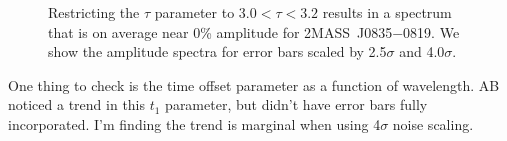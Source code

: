 \documentclass[manuscript]{aastex6}
\newcommand{\sha}{2MASS~J0835$-$0819}
\begin{document}
\begin{figure}[!t]
\centering
{}
	\caption{Restricting the $\tau$ parameter to $3.0 < \tau < 3.2$ results in a spectrum that is on average near 0\% amplitude for \sha. We show the amplitude spectra for error bars scaled by 2.5$\sigma$ and 4.0$\sigma$.}
	\label{fig:ampSpec0835TauRestrict}
	\vspace{0.1in}
\end{figure} 

One thing to check is the time offset parameter as a function of wavelength.
AB noticed a trend in this $t_1$ parameter, but didn't have error bars fully incorporated.
I'm finding the trend is marginal when using 4$\sigma$ noise scaling.
\end{document}
